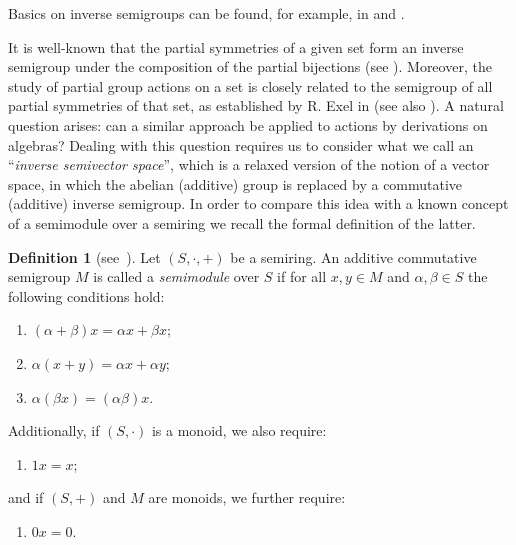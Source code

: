 \documentclass[10pt,a4paper]{amsart}
\theoremstyle{definition}
\newtheorem{defn}[thm]{Definition}
\theoremstyle{remark}
\numberwithin{equation}{section}
\newtheorem*{Theorem A}{\textbf{Theorem A}}
\newtheorem*{Corollary E}{\textbf{Corollary E}}
\newtheorem*{Corollary F}{\textbf{Corollary F}}
\newtheorem*{Theorem B}{\textbf{Theorem B}}
\newtheorem*{Theorem C}{\textbf{Theorem C}}
\newtheorem*{Theorem D}{\textbf{Theorem B}}
\newtheorem*{p a}{\textbf{Proof of  Theorem A}}
\newtheorem*{p b}{\textbf{Proof of Theorem B}}
\newtheorem*{p c}{\textbf{Proof of  Theorem C}}
\newtheorem*{p d}{\textbf{Proof of  Theorem D}}
\newcommand{\0}{{\vartheta}}
\begin{document}
Basics on inverse semigroups can be found, for example, in \cite{Lawson} and  \cite{Petrich1984}. 


It is well-known that the  partial symmetries of a given set form an inverse semigroup under the composition of the partial bijections (see \cite{Lawson}). Moreover, the study of partial group actions on a set is closely related to the semigroup of all partial symmetries of that set, as established by R. Exel in 
\cite{Exel1998} (see also \cite{KL}). A natural question arises: can a similar approach be applied to actions by derivations on algebras?  Dealing with this question requires us to consider  what we call an ``{\em inverse semivector space}'', which is a relaxed version of the notion of a vector space, in which the  abelian (additive) group is replaced by a commutative (additive) inverse semigroup. In order to compare this idea with a known concept of a semimodule over a semiring we recall the formal definition of the latter.

\begin{defn}[see~\cite{Golan,Zimmermann}]\label{defsem}
Let $(S,\cdot,+)$ be a semiring.  An additive commutative semigroup $M$ is called a {\em semimodule} over $S$ if  for all $x,y\in M$ and $\alpha,\beta\in S$ the following conditions hold:
\begin{enumerate}
      \item $(\alpha+\beta)x=\alpha x+\beta x$; 
      \item $\alpha (x+y)=\alpha x+\alpha y$;
      \item $\alpha (\beta x)=(\alpha \beta)x$.
\end{enumerate}
Additionally, if $(S,\cdot)$ is a monoid, we also require:
\begin{enumerate}
    \item[(4)] $1x=x$;
\end{enumerate}
and if $(S,+)$ and $M$ are monoids, we further require: 
\begin{enumerate}
    \item[(5)] $0x=0$.
\end{enumerate}
\end{defn}
\end{document}
